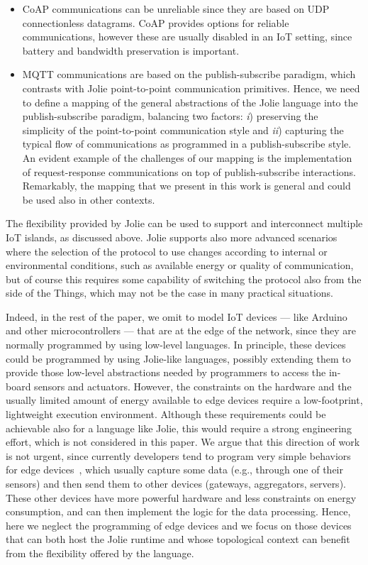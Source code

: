 \begin{itemize}
  \item CoAP communications can be unreliable since they
are based on UDP connectionless datagrams. CoAP provides options for reliable
communications, however these are usually disabled in an IoT setting, since
battery and bandwidth preservation is important.

\item MQTT communications are based on the publish-subscribe
paradigm, which contrasts with Jolie point-to-point communication primitives.
Hence, we need to define a mapping of the general abstractions of the Jolie
language into the publish-subscribe paradigm, balancing two factors: \emph{i})
preserving the simplicity of the point-to-point communication style and
\emph{ii}) capturing the typical flow of communications as programmed in a
publish-subscribe style. An evident example of the challenges of our mapping is
the implementation of request-response communications on top of
publish-subscribe interactions. Remarkably, the mapping that we present in this
work is general and could be used also in other contexts.

\end{itemize}

The flexibility provided by Jolie can be used to support and interconnect
multiple IoT islands, as discussed above. Jolie supports also more advanced
scenarios where the selection of the protocol to use changes according to
internal or environmental conditions, such as available energy or quality of
communication, but of course this requires some capability of switching the
protocol also from the side of the Things, which may not be the case in many
practical situations.

Indeed, in the rest of the paper, we omit to model IoT devices --- like Arduino
and other microcontrollers --- that are at the edge of the network, since they
are normally programmed by using low-level languages.  In principle, these
devices could be programmed by using Jolie-like languages, possibly extending
them to provide those low-level abstractions needed by programmers to access the
in-board sensors and actuators.  However, the constraints on the hardware and
the usually limited amount of energy available to edge devices require a
low-footprint, lightweight execution environment.  Although these requirements
could be achievable also for a language like Jolie, this would require a strong
engineering effort, which is not considered in this paper. We argue that this
direction of work is not urgent, since currently developers tend to program very
simple behaviors for edge devices~\cite{7123563}, which usually capture some
data (e.g., through one of their sensors) and then send them to other devices
(gateways, aggregators, servers). These other devices have more powerful
hardware and less constraints on energy consumption, and can then implement the
logic for the data processing. Hence, here we neglect the programming of edge
devices
%
%
and we focus on those devices that can both host the Jolie
runtime and whose topological context can benefit from the
flexibility offered by the language.
